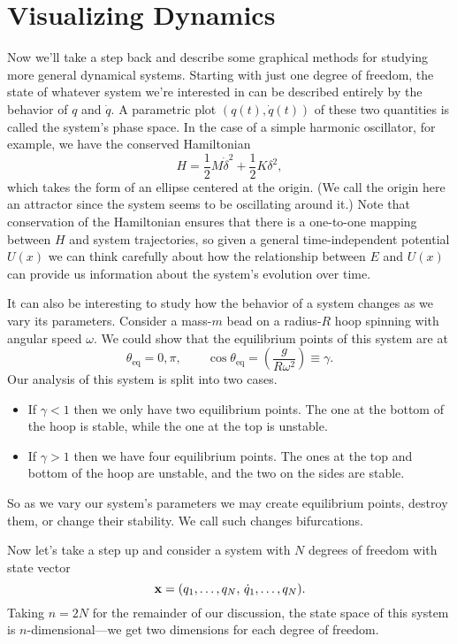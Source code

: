 \documentclass[../p111main.tex]{subfiles}
\begin{document}
\pagebreak

\section{Visualizing Dynamics}
Now we'll take a step back and describe some graphical methods for studying more general dynamical systems.
Starting with just one degree of freedom, the state of whatever system we're interested in can be described entirely by the behavior of $q$ and $\dot q$.
A parametric plot $(q(t), \dot q(t))$ of these two quantities is called the system's phase space.
In the case of a simple harmonic oscillator, for example, we have the conserved Hamiltonian
\[ H = \frac{1}{2} M \dot \delta^2 + \frac{1}{2} K \delta^2, \]
which takes the form of an ellipse centered at the origin.
(We call the origin here an attractor since the system seems to be oscillating around it.)
Note that conservation of the Hamiltonian ensures that there is a one-to-one mapping between $H$ and system trajectories, so given a general time-independent potential $U(x)$ we can think carefully about how the relationship between $E$ and $U(x)$ can provide us information about the system's evolution over time.

It can also be interesting to study how the behavior of a system changes as we vary its parameters.
Consider a mass-$m$ bead on a radius-$R$ hoop spinning with angular speed $\omega$.
We could show that the equilibrium points of this system are at
\[ \theta_\textrm{eq} = 0, \pi, \qquad \cos \theta_\textrm{eq} = \left( \frac{g}{R\omega^2} \right) \equiv \gamma. \]
Our analysis of this system is split into two cases.
\begin{itemize}[topsep=0pt]
    \item If $\gamma < 1$ then we only have two equilibrium points.
    The one at the bottom of the hoop is stable, while the one at the top is unstable.

    \item If $\gamma > 1$ then we have four equilibrium points.
    The ones at the top and bottom of the hoop are unstable, and the two on the sides are stable.
\end{itemize}
So as we vary our system's parameters we may create equilibrium points, destroy them, or change their stability.
We call such changes bifurcations.

Now let's take a step up and consider a system with $N$ degrees of freedom with state vector
\[ \mathbf{x} = (q_1, \ldots, q_N, \,\dot q_1, \ldots, q_N). \]
Taking $n = 2N$ for the remainder of our discussion, the state space of this system is $n$-dimensional---we get two dimensions for each degree of freedom.
\end{document}
